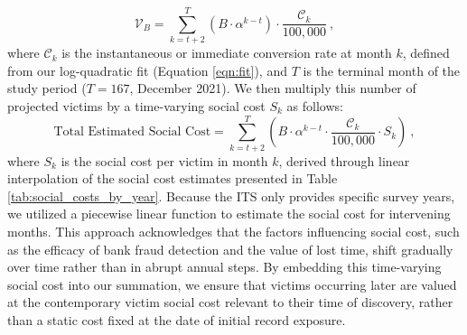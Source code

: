 \begin{equation}
    \mathcal{V}_B = \sum_{k=t+2}^{T} (B \cdot \alpha^{k-t}) \cdot \frac{\mathcal{C}_k}{100,000}~, 
\end{equation}
where $\mathcal{C}_k$ is the instantaneous or immediate conversion rate at month $k$, defined from our log-quadratic fit (Equation \ref{eqn:fit}), and $T$ is the terminal month of the study period ($T=167$, December 2021). 
We then multiply this number of projected victims by a time-varying social cost $S_k$ as follows:
%
\begin{equation}
\label{eq:social_cost_breach_upper}
\text{Total Estimated Social Cost} = \sum_{k=t+2}^{T} \left( B \cdot \alpha^{k-t} \cdot \frac{\mathcal{C}_k}{100,000} \cdot S_k \right)~, 
\end{equation}
where $S_k$ is the social cost per victim in month $k$, derived through linear interpolation of the social cost estimates presented in Table \ref{tab:social_costs_by_year}. Because the ITS only provides specific survey years, we utilized a piecewise linear function to estimate the social cost for intervening months. This approach acknowledges that the factors influencing social cost, such as the efficacy of bank fraud detection and the value of lost time, shift gradually over time rather than in abrupt annual steps. By embedding this time-varying social cost into our summation, we ensure that victims occurring later are valued at the contemporary victim social cost relevant to their time of discovery, rather than a static cost fixed at the date of initial record exposure. 


